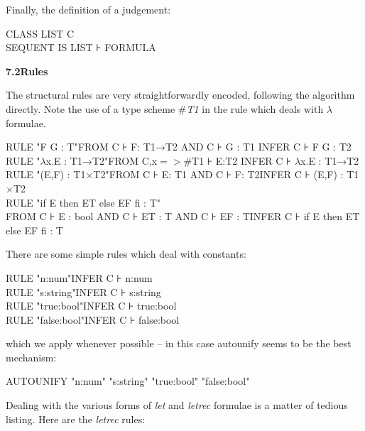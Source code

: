 \documentclass[11pt]{book}
\newcommand{\tab}{\hspace{5mm}}
\begin{document}
Finally, the definition of a judgement:

CLASS LIST C\\
SEQUENT IS LIST ⊦ FORMULA


\textbf{7.2\tab Rules}


The structural rules are very straightforwardly encoded, following the algorithm directly. Note the use of a type scheme \#\textit{T1} in the rule which deals with \ensuremath{\lambda} formulae.

RULE "F G : T"\tab FROM C ⊦ F: T1→T2 AND C ⊦ G : T1 \tab INFER C ⊦ F G : T2\\
RULE "$\lambda$x.E : T1→T2"\tab FROM C,x$=>$\#T1 ⊦ E:T2 \tab INFER C ⊦ $\lambda$x.E : T1→T2\\
RULE "(E,F) : T1$\times$T2"\tab FROM C ⊦ E: T1 AND C ⊦ F: T2\tab INFER C ⊦ (E,F) : T1$\times$T2\\
RULE "if E then ET else EF fi : T"\\
\tab FROM C ⊦ E : bool AND C ⊦ ET : T AND C ⊦ EF : T\tab INFER C ⊦ if E then ET else EF fi : T


There are some simple rules which deal with constants:

RULE "n:num"\tab INFER C ⊦ n:num\\
RULE "s:string"\tab INFER C ⊦ s:string\\
RULE "true:bool"\tab INFER C ⊦ true:bool\\
RULE "false:bool"\tab INFER C ⊦ false:bool


which we apply whenever possible -- in this case autounify seems to be the best mechanism:

AUTOUNIFY "n:num" "s:string" "true:bool" "false:bool"


Dealing with the various forms of \textit{let} and \textit{letrec} formulae is a matter of tedious listing. Here are the \textit{letrec} rules:
\end{document}
